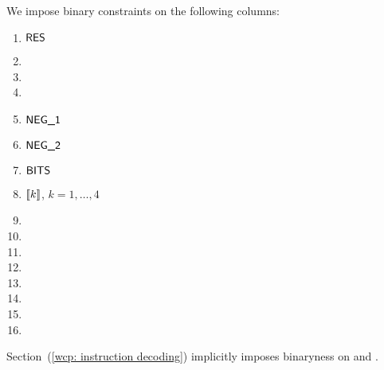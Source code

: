 We impose binary constraints on the following columns:
\begin{multicols}{4}
	\begin{enumerate}
		\item $\textsf{RES}$
		\item[\vspace{\fill}]
		\item[\vspace{\fill}]
		\item[\vspace{\fill}]
		\item $\textsf{NEG\_1}$
		\item $\textsf{NEG\_2}$
		\item $\textsf{BITS}$
		\item $[\![k]\!]$, $k = 1,\dots, 4$
		\item \isIszero
		\item \isEq
		\item \isSgt
		\item \isSlt
		\item \isLt
		\item \isGt
		\item \isLeq
		\item \isGeq
	\end{enumerate}
\end{multicols}
\saNote{} Section~(\ref{wcp: instruction decoding}) implicitly imposes binaryness on \oli{} and \vli{}.
